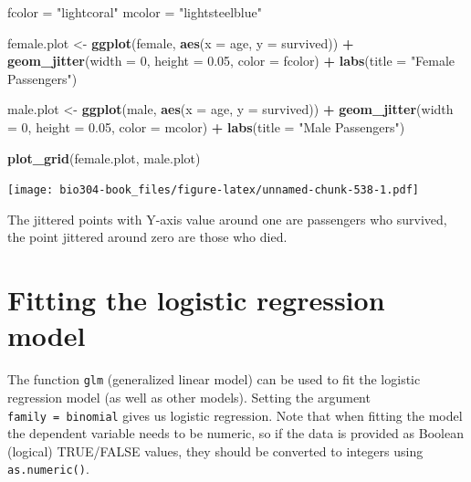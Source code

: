 \documentclass[]{book}
\newenvironment{Shaded}{\begin{snugshade}}{\end{snugshade}}
\newcommand{\DataTypeTok}[1]{\textcolor[rgb]{0.13,0.29,0.53}{#1}}
\newcommand{\DecValTok}[1]{\textcolor[rgb]{0.00,0.00,0.81}{#1}}
\newcommand{\FloatTok}[1]{\textcolor[rgb]{0.00,0.00,0.81}{#1}}
\newcommand{\KeywordTok}[1]{\textcolor[rgb]{0.13,0.29,0.53}{\textbf{#1}}}
\newcommand{\NormalTok}[1]{#1}
\newcommand{\OperatorTok}[1]{\textcolor[rgb]{0.81,0.36,0.00}{\textbf{#1}}}
\newcommand{\StringTok}[1]{\textcolor[rgb]{0.31,0.60,0.02}{#1}}
\theoremstyle{definition}
\theoremstyle{definition}
\theoremstyle{definition}
\theoremstyle{remark}
\begin{document}
\begin{Shaded}
\begin{Highlighting}[]
\NormalTok{fcolor =}\StringTok{ "lightcoral"}
\NormalTok{mcolor =}\StringTok{ "lightsteelblue"}

\NormalTok{female.plot <-}\StringTok{ }\KeywordTok{ggplot}\NormalTok{(female, }\KeywordTok{aes}\NormalTok{(}\DataTypeTok{x =}\NormalTok{ age, }\DataTypeTok{y =}\NormalTok{ survived)) }\OperatorTok{+}\StringTok{ }
\StringTok{  }\KeywordTok{geom_jitter}\NormalTok{(}\DataTypeTok{width =} \DecValTok{0}\NormalTok{, }\DataTypeTok{height =} \FloatTok{0.05}\NormalTok{, }\DataTypeTok{color =}\NormalTok{ fcolor) }\OperatorTok{+}
\StringTok{  }\KeywordTok{labs}\NormalTok{(}\DataTypeTok{title =} \StringTok{"Female Passengers"}\NormalTok{)}

\NormalTok{male.plot <-}\StringTok{ }\KeywordTok{ggplot}\NormalTok{(male, }\KeywordTok{aes}\NormalTok{(}\DataTypeTok{x =}\NormalTok{ age, }\DataTypeTok{y =}\NormalTok{ survived)) }\OperatorTok{+}\StringTok{ }
\StringTok{  }\KeywordTok{geom_jitter}\NormalTok{(}\DataTypeTok{width =} \DecValTok{0}\NormalTok{, }\DataTypeTok{height =} \FloatTok{0.05}\NormalTok{, }\DataTypeTok{color =}\NormalTok{ mcolor) }\OperatorTok{+}\StringTok{ }
\StringTok{  }\KeywordTok{labs}\NormalTok{(}\DataTypeTok{title =} \StringTok{"Male Passengers"}\NormalTok{)}

\KeywordTok{plot_grid}\NormalTok{(female.plot, male.plot)}
\end{Highlighting}
\end{Shaded}

\texttt{[image: bio304-book\_files/figure-latex/unnamed-chunk-538-1.pdf]}

The jittered points with Y-axis value around one are passengers who
survived, the point jittered around zero are those who died.

\hypertarget{fitting-the-logistic-regression-model}{%
\section{Fitting the logistic regression
model}\label{fitting-the-logistic-regression-model}}

The function \texttt{glm} (generalized linear model) can be used to fit
the logistic regression model (as well as other models). Setting the
argument \texttt{family\ =\ binomial} gives us logistic regression. Note
that when fitting the model the dependent variable needs to be numeric,
so if the data is provided as Boolean (logical) TRUE/FALSE values, they
should be converted to integers using \texttt{as.numeric()}.
\end{document}
